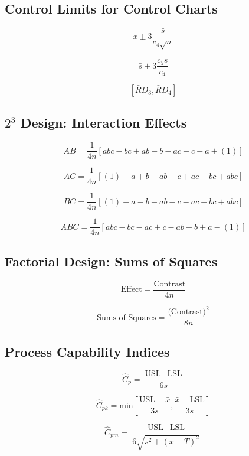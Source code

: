 \documentclass[a4paper,12pt]{article}
\begin{document}
{\subsection*{Control Limits for Control Charts}

\begin{multicols}{2}
	
\[ \bar{\bar{x}} \pm 3\frac{\bar{s}}{c_4\sqrt{n}}\]

\[ \bar{s} \pm 3\frac{c_5\bar{s}}{c_4}\]

\[\left[ \bar{R}D_3, \bar{R}D_4\right]\]
\end{multicols}
\subsection*{$2^3$ Design: Interaction Effects}

\[ AB = \frac{1}{4n} \left[ abc - bc + ab - b - ac + c - a + (1) \right] \]

\[ AC = \frac{1}{4n} \left[ (1) - a + b - ab -c + ac - bc + abc \right] \]

\[ BC = \frac{1}{4n} \left[ (1) + a - b - ab - c - ac + bc + abc \right] \]

\[ABC = \frac{1}{4n} \left[ abc - bc - ac + c - ab + b +  a - (1) \right] \]

\bigskip


\subsection*{Factorial Design: Sums of Squares}

\[\mbox{Effect} =  \frac{\mbox{Contrast}}{4n}\]

\[\mbox{Sums of Squares} =  \frac{\mbox{(Contrast)}^2}{8n}\]

\normalsize{
\subsection*{Process Capability Indices}
\begin{multicols}{2}
\[ \hat{C}_p = \frac{\mbox{USL} - \mbox{LSL}}{6s}\]

\[ \hat{C}_{pk} = \mbox{min} \left[\frac{\mbox{USL} - \bar{x}}{3s},\frac{\bar{x} - \mbox{LSL}}{3s} \right] \]

\[ \hat{C}_{pm} = \frac{\mbox{USL} - \mbox{LSL}}{6\sqrt{s^2+(\bar{x}-T)^2}}\]
\end{multicols}
	\newpage
	
}}
\end{document}
